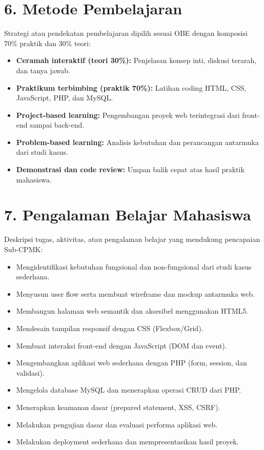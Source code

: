 \documentclass[12pt,a4paper]{article}
\begin{document}
\section*{6. Metode Pembelajaran}

Strategi atau pendekatan pembelajaran dipilih sesuai OBE dengan komposisi 70\% praktik dan 30\% teori:

\begin{itemize}[leftmargin=*]
  \item \textbf{Ceramah interaktif (teori 30\%):} Penjelasan konsep inti, diskusi terarah, dan tanya jawab.
  \item \textbf{Praktikum terbimbing (praktik 70\%):} Latihan coding HTML, CSS, JavaScript, PHP, dan MySQL.
  \item \textbf{Project-based learning:} Pengembangan proyek web terintegrasi dari front-end sampai back-end.
  \item \textbf{Problem-based learning:} Analisis kebutuhan dan perancangan antarmuka dari studi kasus.
  \item \textbf{Demonstrasi dan code review:} Umpan balik cepat atas hasil praktik mahasiswa.
\end{itemize}

\vspace{0.5cm}

\section*{7. Pengalaman Belajar Mahasiswa}

Deskripsi tugas, aktivitas, atau pengalaman belajar yang mendukung pencapaian Sub-CPMK:

\begin{itemize}[leftmargin=*]
  \item Mengidentifikasi kebutuhan fungsional dan non-fungsional dari studi kasus sederhana.
  \item Menyusun user flow serta membuat wireframe dan mockup antarmuka web.
  \item Membangun halaman web semantik dan aksesibel menggunakan HTML5.
  \item Mendesain tampilan responsif dengan CSS (Flexbox/Grid).
  \item Membuat interaksi front-end dengan JavaScript (DOM dan event).
  \item Mengembangkan aplikasi web sederhana dengan PHP (form, session, dan validasi).
  \item Mengelola database MySQL dan menerapkan operasi CRUD dari PHP.
  \item Menerapkan keamanan dasar (prepared statement, XSS, CSRF).
  \item Melakukan pengujian dasar dan evaluasi performa aplikasi web.
  \item Melakukan deployment sederhana dan mempresentasikan hasil proyek.
\end{itemize}
\end{document}
